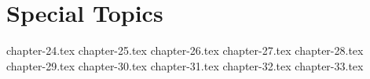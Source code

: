 \part{Special Topics}
{chapter-24.tex}
{chapter-25.tex}
{chapter-26.tex}
{chapter-27.tex}
{chapter-28.tex}
{chapter-29.tex}
{chapter-30.tex}
{chapter-31.tex}
{chapter-32.tex}
{chapter-33.tex}
